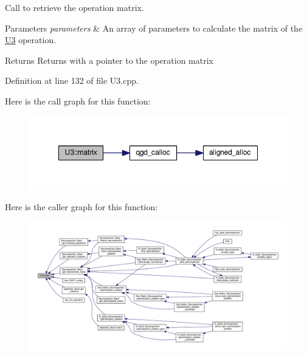 Call to retrieve the operation matrix. 


\begin{DoxyParams}{Parameters}
{\em parameters} & An array of parameters to calculate the matrix of the \hyperlink{class_u3}{U3} operation. \\
\hline
\end{DoxyParams}
\begin{DoxyReturn}{Returns}
Returns with a pointer to the operation matrix 
\end{DoxyReturn}


Definition at line 132 of file U3.\+cpp.



Here is the call graph for this function\+:
\nopagebreak
\begin{figure}[H]
\begin{center}
\leavevmode
\includegraphics[width=348pt]{class_u3_a92b07b2d856a85bd6a706d4bfc071ac8_cgraph}
\end{center}
\end{figure}




Here is the caller graph for this function\+:
\nopagebreak
\begin{figure}[H]
\begin{center}
\leavevmode
\includegraphics[width=350pt]{class_u3_a92b07b2d856a85bd6a706d4bfc071ac8_icgraph}
\end{center}
\end{figure}


